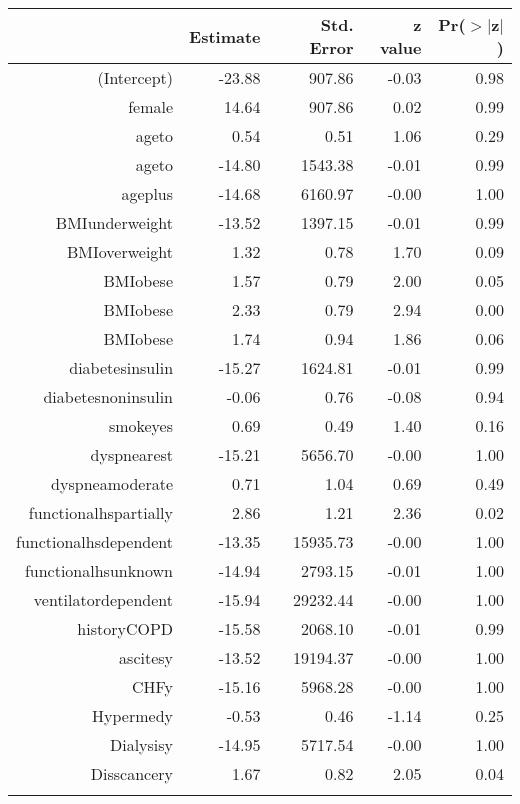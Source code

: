 \bigskip\bigskip
\centering
\begin{tabular}{rrrrr}
  \hline
 & Estimate & Std. Error & z value & Pr($>$$|$z$|$) \\ 
  \hline
(Intercept) & -23.88 & 907.86 & -0.03 & 0.98 \\ 
  female & 14.64 & 907.86 & 0.02 & 0.99 \\ 
  age\-65\-to\-74 & 0.54 & 0.51 & 1.06 & 0.29 \\ 
  age\-75\-to\-84 & -14.80 & 1543.38 & -0.01 & 0.99 \\ 
  age\-85\-plus & -14.68 & 6160.97 & -0.00 & 1.00 \\ 
  BMI\-underweight & -13.52 & 1397.15 & -0.01 & 0.99 \\ 
  BMI\-overweight & 1.32 & 0.78 & 1.70 & 0.09 \\ 
  BMI\-obese\-1 & 1.57 & 0.79 & 2.00 & 0.05 \\ 
  BMI\-obese\-2 & 2.33 & 0.79 & 2.94 & 0.00 \\ 
  BMI\-obese\-3 & 1.74 & 0.94 & 1.86 & 0.06 \\ 
  diabetes\-insulin & -15.27 & 1624.81 & -0.01 & 0.99 \\ 
  diabetes\-noninsulin & -0.06 & 0.76 & -0.08 & 0.94 \\ 
  smoke\-yes & 0.69 & 0.49 & 1.40 & 0.16 \\ 
  dyspnea\-rest & -15.21 & 5656.70 & -0.00 & 1.00 \\ 
  dyspnea\-moderate & 0.71 & 1.04 & 0.69 & 0.49 \\ 
  functional\-hs\-partially & 2.86 & 1.21 & 2.36 & 0.02 \\ 
  functional\-hs\-dependent & -13.35 & 15935.73 & -0.00 & 1.00 \\ 
  functional\-hs\-unknown & -14.94 & 2793.15 & -0.01 & 1.00 \\ 
  ventilator\-dependent & -15.94 & 29232.44 & -0.00 & 1.00 \\ 
  history\-COPD & -15.58 & 2068.10 & -0.01 & 0.99 \\ 
  ascites\-y & -13.52 & 19194.37 & -0.00 & 1.00 \\ 
  CHF\-y & -15.16 & 5968.28 & -0.00 & 1.00 \\ 
  Hyper\-med\-y & -0.53 & 0.46 & -1.14 & 0.25 \\ 
  Dialysis\-y & -14.95 & 5717.54 & -0.00 & 1.00 \\ 
  Diss\-cancer\-y & 1.67 & 0.82 & 2.05 & 0.04 \\ 
$$
\end{tabular}

